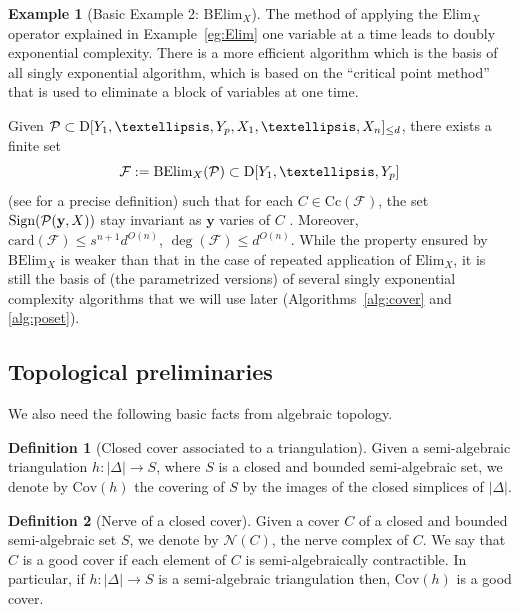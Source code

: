 \documentclass{amsart}[10pts]
\theoremstyle{definition}
\newtheorem{definition}{Definition}[section]
\newtheorem{example}{Example}[section]
\theoremstyle{remark}
\theoremstyle{observation}
\numberwithin{equation}{section}
\newcommand {\D}     {\mbox{\rm D}}
\newcommand {\Sign}      {\mbox{\rm Sign}}
\newcommand{\card}{\mathrm{card}}
\newcommand{\y}{\mathbf{y}}
\newcommand{\Cc}{\mathrm{Cc}}
\newcommand{\Nerve}{\mathcal{N}}
\newcommand{\Cov}{\mathrm{Cov}}
\newcommand{\Elim}{\mathrm{Elim}}
\newcommand{\BElim}{\mathrm{BElim}}
\begin{document}
\begin{example}[Basic Example 2: $\BElim_X$]
    \label{eg:BElim}
    The method of applying the $\Elim_X$ operator explained in Example~\ref{eg:Elim} one variable at a time leads to doubly exponential complexity. There is a more efficient algorithm which is the basis of all singly exponential algorithm, which is based on the  ``critical point method'' that is used to eliminate a block of variables at one time. 

    Given $\mathcal{P} \subset \D[Y_1,\ldots,Y_p,X_1,\ldots,X_n]_{\leq d}$,
    there exists a finite set 
    \[
    \mathcal{F} := \BElim_X(\mathcal{P}) \subset \D[Y_1,\ldots,Y_p]
    \]
    (see \cite[Algorithm 14.1]{BPRbook2} for a precise definition)
    such that for each $C \in \Cc(\mathcal{F})$, the set 
    $\Sign(\mathcal{P}(\y,X))$ stay invariant as $\y$ varies of $C$
    \cite{BPRbook2}. Moreover, $\card(\mathcal{F}) \leq s^{n+1} d^{O(n)}$, $\deg(\mathcal{F}) \leq d^{O(n)}$. 
    While the property ensured by $\BElim_X$ is weaker than that
    in the case of repeated application of $\Elim_X$, it is still the basis of (the parametrized versions) of several singly exponential complexity algorithms that we will use later (Algorithms~\ref{alg:cover} and \ref{alg:poset}).
\end{example}


\subsection{Topological preliminaries}
\label{subsec:top}
We also need the following basic facts from algebraic topology.

\begin{definition}[Closed cover associated to a triangulation]
\label{def:triangulation-cover}
    Given a semi-algebraic triangulation $h: |\Delta| \rightarrow S$, where $S$ is a closed and bounded semi-algebraic set, we denote by
    $\Cov(h)$ the covering of $S$ by the images of the closed simplices of $|\Delta|$.
\end{definition}

\begin{definition}[Nerve of a closed cover]
\label{def:nerve-cover}
    Given a cover $C$ of a closed and bounded semi-algebraic set $S$,
    we denote by $\Nerve(C)$, the nerve complex of $C$. We say that $C$ is a good cover if each element of $C$ is semi-algebraically contractible. In particular, if $h: |\Delta| \rightarrow S$ is a semi-algebraic triangulation then, $\Cov(h)$ is a good cover. 
\end{definition}
\end{document}
